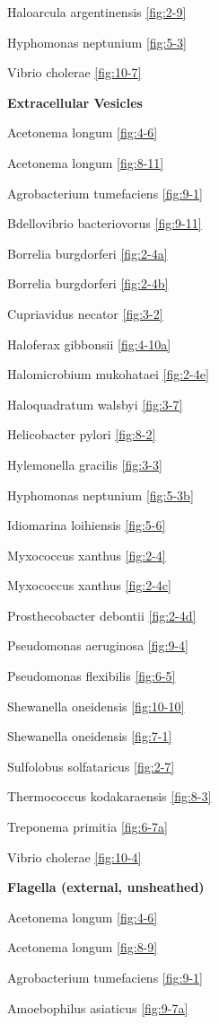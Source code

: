 \documentclass[]{tufte-book}
\begin{document}
Haloarcula argentinensis \ref{fig:2-9}

Hyphomonas neptunium \ref{fig:5-3}

Vibrio cholerae \ref{fig:10-7}

\textbf{Extracellular Vesicles}

Acetonema longum \ref{fig:4-6}

Acetonema longum \ref{fig:8-11}

Agrobacterium tumefaciens \ref{fig:9-1}

Bdellovibrio bacteriovorus \ref{fig:9-11}

Borrelia burgdorferi \ref{fig:2-4a}

Borrelia burgdorferi \ref{fig:2-4b}

Cupriavidus necator \ref{fig:3-2}

Haloferax gibbonsii \ref{fig:4-10a}

Halomicrobium mukohataei \ref{fig:2-4e}

Haloquadratum walsbyi \ref{fig:3-7}

Helicobacter pylori \ref{fig:8-2}

Hylemonella gracilis \ref{fig:3-3}

Hyphomonas neptunium \ref{fig:5-3b}

Idiomarina loihiensis \ref{fig:5-6}

Myxococcus xanthus \ref{fig:2-4}

Myxococcus xanthus \ref{fig:2-4c}

Prosthecobacter debontii \ref{fig:2-4d}

Pseudomonas aeruginosa \ref{fig:9-4}

Pseudomonas flexibilis \ref{fig:6-5}

Shewanella oneidensis \ref{fig:10-10}

Shewanella oneidensis \ref{fig:7-1}

Sulfolobus solfataricus \ref{fig:2-7}

Thermococcus kodakaraensis \ref{fig:8-3}

Treponema primitia \ref{fig:6-7a}

Vibrio cholerae \ref{fig:10-4}

\textbf{Flagella (external, unsheathed)}

Acetonema longum \ref{fig:4-6}

Acetonema longum \ref{fig:8-9}

Agrobacterium tumefaciens \ref{fig:9-1}

Amoebophilus asiaticus \ref{fig:9-7a}
\end{document}
